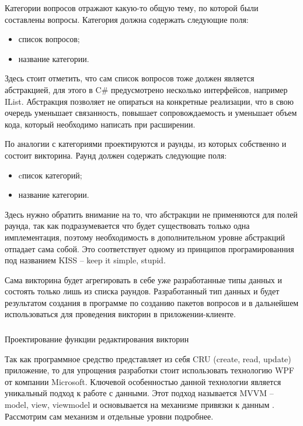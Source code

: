 Категории вопросов отражают какую-то общую тему, по которой были составлены вопросы. Категория должна содержать следующие поля:

\begin{itemize}
	\item список вопросов;
	\item название категории.
\end{itemize}

Здесь стоит отметить, что сам список вопросов тоже должен является абстракцией, для этого в C\# предусмотрено несколько интерфейсов, например IList. Абстракция позволяет не
опираться на конкретные реализации, что в свою очередь уменьшает связанность, повышает сопровождаемость и уменьшает объем кода, который необходимо написать при расширении.

По аналогии с категориями проектируются и раунды, из которых собственно и состоит викторина. Раунд должен содержать следующие поля:

\begin{itemize}
	\item cписок категорий;
	\item название категории.
\end{itemize}

Здесь нужно обратить внимание на то, что абстракции не применяются для полей раунда, так как подразумевается что будет существовать только одна имплементация, поэтому 
необходимость в дополнительном уровне абстракций отпадает сама собой. Это соответствует одному из принципов програмированния под названием KISS -- keep it simple, stupid.

Сама викторина будет агрегировать в себе уже разработанные типы данных и состоять только лишь из списка раундов. Разработанный тип данных и будет результатом создания в 
программе по созданию пакетов вопросов и в дальнейшем использоваться для проведения викторин в приложении-клиенте.

\subsubsection{} Проектирование функции редактирования викторин
\label{sec:design:tester:editor}

Так как программное средство представляет из себя CRU (create, read, update) приложение, то для упрощения разработки стоит использовать технологию WPF от компании Microsoft.
Ключевой особенностью данной технологии является уникальный подход к работе с данными. Этот подход называется MVVM -- model, view, viewmodel и основывается на механизме привязки к данным \cite{book_mvvm}.
Рассмотрим сам механизм и отдельные уровни подробнее.

